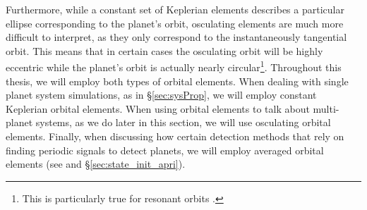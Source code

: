 Furthermore, while a constant set of Keplerian elements describes a particular ellipse corresponding to the planet's orbit, osculating elements are much more difficult to interpret, as they only correspond to the instantaneously tangential orbit.  This means that in certain cases the osculating orbit will be highly eccentric while the planet's orbit is actually nearly circular\footnote{This is particularly true for resonant orbits \citep{tinney20062}.}.  Throughout this thesis, we will employ both types of orbital elements.  When dealing with single planet system simulations, as in \S\ref{sec:sysProp}, we will employ constant Keplerian orbital elements.  When using orbital elements to talk about multi-planet systems, as we do later in this section, we will use osculating orbital elements.  Finally, when discussing how certain detection methods that rely on finding periodic signals to detect planets, we will employ averaged orbital elements (see  and \S\ref{sec:state_init_apri}).

